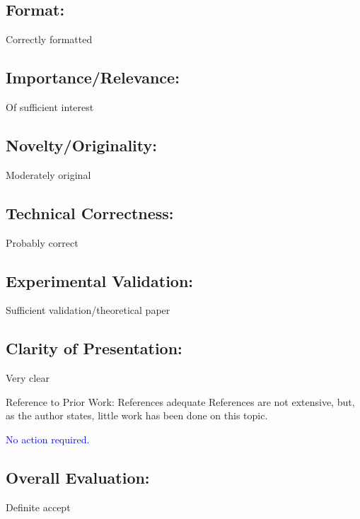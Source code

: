 \documentclass[11pt]{amsart}
\begin{document}
\subsection{Format:} Correctly formatted

\subsection{Importance/Relevance:}
 Of sufficient interest

\subsection{Novelty/Originality:}
 Moderately original

\subsection{Technical Correctness: }
Probably correct

\subsection{Experimental Validation:}
 Sufficient validation/theoretical paper

\subsection{Clarity of Presentation:}
 Very clear

Reference to Prior Work: References adequate References are not extensive, but, as the author states, little work has been done on this topic.

\textcolor{blue}{
No action required.}

\subsection{Overall Evaluation:}
 Definite accept
\end{document}
